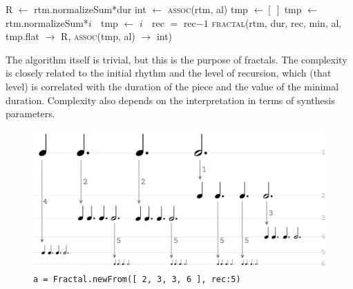 \documentclass{article}
\begin{document}
\begin{algorithmic}%
\State
 R $\gets$ rtm.normalizeSum*dur \EndIf
{} int $\gets$ \textsc{assoc}(rtm, al) \EndIf
\State tmp $\gets [\:]$ 
\State 
{} 
\State tmp $\gets$ rtm.normalizeSum*$i$
\Else $\;$ tmp $\gets$ $i$
\EndIf
\EndFor
\State
{} 
\State \Return [R, int]
\Else  $\;$  
 rec $=$ rec$-1$ \EndIf
\State \textsc{fractal}(rtm, dur, rec, min, al, 
        \newline \hspace*{5em} tmp.flat $\to$ R, 
        \newline \hspace*{5em} \textsc{assoc}(tmp, al) $\to$ int)
\EndIf
\EndProcedure
\State
{}
\end{algorithmic}

\bigskip

The algorithm itself is trivial, but this is the purpose of fractals. The complexity is closely related to the initial rhythm and the level of recursion, which (that level) is correlated with the duration of the piece and the value of the minimal duration. Complexity also depends on the interpretation in terms of synthesis parameters.

\begin{figure}[htbp]
\includegraphics[width=\textwidth]{fractal}
\caption{\texttt{a = Fractal.newFrom([ 2, 3, 3, 6 ], rec:5)}}
\label{fractal}
\end{figure}
\end{document}
